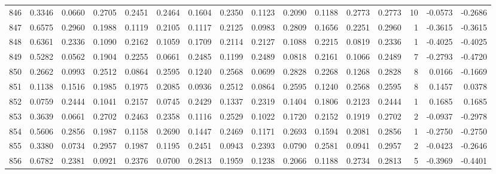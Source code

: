 \begin{tabular}{lrrrrrrrrrrrrrrr}
846 &      0.3346 &  0.0660 &  0.2705 &  0.2451 &  0.2464 &  0.1604 &  0.2350 &  0.1123 &  0.2090 &  0.1188 &   0.2773 &     0.2773 &     10 &                   -0.0573 &                    -0.2686 \\
847 &      0.6575 &  0.2960 &  0.1988 &  0.1119 &  0.2105 &  0.1117 &  0.2125 &  0.0983 &  0.2809 &  0.1656 &   0.2251 &     0.2960 &      1 &                   -0.3615 &                    -0.3615 \\
848 &      0.6361 &  0.2336 &  0.1090 &  0.2162 &  0.1059 &  0.1709 &  0.2114 &  0.2127 &  0.1088 &  0.2215 &   0.0819 &     0.2336 &      1 &                   -0.4025 &                    -0.4025 \\
849 &      0.5282 &  0.0562 &  0.1904 &  0.2255 &  0.0661 &  0.2485 &  0.1199 &  0.2489 &  0.0818 &  0.2161 &   0.1066 &     0.2489 &      7 &                   -0.2793 &                    -0.4720 \\
850 &      0.2662 &  0.0993 &  0.2512 &  0.0864 &  0.2595 &  0.1240 &  0.2568 &  0.0699 &  0.2828 &  0.2268 &   0.1268 &     0.2828 &      8 &                    0.0166 &                    -0.1669 \\
851 &      0.1138 &  0.1516 &  0.1985 &  0.1975 &  0.2085 &  0.0936 &  0.2512 &  0.0864 &  0.2595 &  0.1240 &   0.2568 &     0.2595 &      8 &                    0.1457 &                     0.0378 \\
852 &      0.0759 &  0.2444 &  0.1041 &  0.2157 &  0.0745 &  0.2429 &  0.1337 &  0.2319 &  0.1404 &  0.1806 &   0.2123 &     0.2444 &      1 &                    0.1685 &                     0.1685 \\
853 &      0.3639 &  0.0661 &  0.2702 &  0.2463 &  0.2358 &  0.1116 &  0.2529 &  0.1022 &  0.1720 &  0.2152 &   0.1919 &     0.2702 &      2 &                   -0.0937 &                    -0.2978 \\
854 &      0.5606 &  0.2856 &  0.1987 &  0.1158 &  0.2690 &  0.1447 &  0.2469 &  0.1171 &  0.2693 &  0.1594 &   0.2081 &     0.2856 &      1 &                   -0.2750 &                    -0.2750 \\
855 &      0.3380 &  0.0734 &  0.2957 &  0.1987 &  0.1195 &  0.2451 &  0.0943 &  0.2393 &  0.0790 &  0.2581 &   0.0941 &     0.2957 &      2 &                   -0.0423 &                    -0.2646 \\
856 &      0.6782 &  0.2381 &  0.0921 &  0.2376 &  0.0700 &  0.2813 &  0.1959 &  0.1238 &  0.2066 &  0.1188 &   0.2734 &     0.2813 &      5 &                   -0.3969 &                    -0.4401 \\

\end{tabular}
